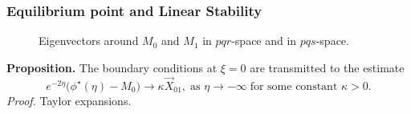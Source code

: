 \documentclass{beamer}
\begin{document}
\begin{frame}
\frametitle{Equilibrium point and Linear Stability}
\begin{figure}
 \centering
  \subfigure[$pqr$-space]{
  \psfrag{r}{\scriptsize$r$}%
  \texttt{[image: equilibriapqr.eps]}\label{fig:eq1}
  }
  \quad 
  \subfigure[$pqs$-space]{
  \psfrag{r}{\scriptsize$s-\frac{1+m}{1+\alpha}$}%
  \texttt{[image: equilibriapqs.eps]}\label{fig:eq2}
  }
  \caption{Eigenvectors around $M_0$ and $M_1$ in $pqr$-space and in $pqs$-space.} \label{fig:equilibria}
\end{figure}
{\bf Proposition.} The boundary conditions at $\xi=0$ are transmitted to the estimate
 $$e^{-2\eta}\Big(\phi^\star(\eta)- M_0\Big) \rightarrow \kappa\vec{X}_{01}, \; \text{as $\eta \rightarrow -\infty$} \;
\text{for some constant $\kappa>0$}.$$
 {\it Proof.} Taylor expansions.
\end{frame}
\end{document}
